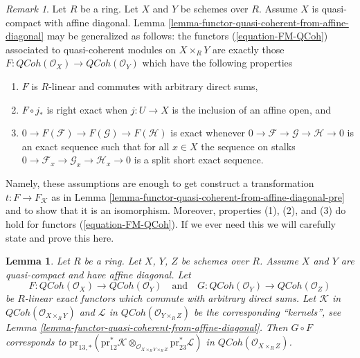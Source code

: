 \documentclass{stacks-project}
\theoremstyle{plain}
\newtheorem{lemma}[subsection]{Lemma}
\theoremstyle{definition}
\theoremstyle{remark}
\newtheorem{remark}[subsection]{Remark}
\numberwithin{equation}{subsection}
\def\QCoh{\mathit{QCoh}}
\begin{document}
\begin{remark}
\label{remark-characterize-FM-QCoh}
Let $R$ be a ring. Let $X$ and $Y$ be schemes over $R$. Assume $X$
is quasi-compact with affine diagonal.
Lemma \ref{lemma-functor-quasi-coherent-from-affine-diagonal} may
be generalized as follows: the functors
(\ref{equation-FM-QCoh}) associated to quasi-coherent modules on
$X \times_R Y$ are exactly those
$F : \QCoh(\mathcal{O}_X) \to \QCoh(\mathcal{O}_Y)$
which have the following properties
\begin{enumerate}
\item $F$ is $R$-linear and commutes with arbitrary direct sums,
\item $F \circ j_*$ is right exact when $j : U \to X$ is the
inclusion of an affine open, and
\item $0 \to F(\mathcal{F}) \to F(\mathcal{G}) \to F(\mathcal{H})$
is exact whenever $0 \to \mathcal{F} \to \mathcal{G} \to \mathcal{H} \to 0$
is an exact sequence such that for all $x \in X$ the sequence on stalks
$0 \to \mathcal{F}_x \to \mathcal{G}_x \to \mathcal{H}_x \to 0$
is a split short exact sequence.
\end{enumerate}
Namely, these assumptions are enough to get construct a transformation
$t : F \to F_\mathcal{K}$ as in
Lemma \ref{lemma-functor-quasi-coherent-from-affine-diagonal-pre}
and to show that it is an isomorphism. Moreover, properties (1), (2), and (3)
do hold for functors (\ref{equation-FM-QCoh}).
If we ever need this we will carefully state and prove this here.
\end{remark}

\begin{lemma}
\label{lemma-compose-FM-QCoh}
Let $R$ be a ring. Let $X$, $Y$, $Z$ be schemes over $R$. Assume
$X$ and $Y$ are quasi-compact and have affine diagonal. Let
$$
F : \QCoh(\mathcal{O}_X) \to \QCoh(\mathcal{O}_Y)
\quad\text{and}\quad
G : \QCoh(\mathcal{O}_Y) \to \QCoh(\mathcal{O}_Z)
$$
be $R$-linear exact functors which commute with arbitrary direct sums.
Let $\mathcal{K}$ in $\QCoh(\mathcal{O}_{X \times_R Y})$
and $\mathcal{L}$ in $\QCoh(\mathcal{O}_{Y \times_R Z})$
be the corresponding ``kernels'', see
Lemma \ref{lemma-functor-quasi-coherent-from-affine-diagonal}.
Then $G \circ F$ corresponds to
$\text{pr}_{13, *}(\text{pr}_{12}^*\mathcal{K}
\otimes_{\mathcal{O}_{X \times_R Y \times_R Z}}
\text{pr}_{23}^*\mathcal{L})$ in $\QCoh(\mathcal{O}_{X \times_R Z})$.
\end{lemma}
\end{document}
